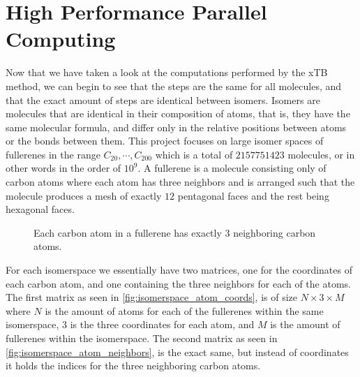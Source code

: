 
\section{High Performance Parallel Computing}

Now that we have taken a look at the computations performed by the xTB method, we can begin to see that the steps are the same for all molecules, and that the exact amount of steps are identical between isomers. Isomers are molecules that are identical in their composition of atoms, that is, they have the same molecular formula, and differ only in the relative positions between atoms or the bonds between them.
This project focuses on large isomer spaces of fullerenes in the range \(C_{20}, \cdots, C_{200} \) which is a total of $2157751423$ molecules, or in other words in the order of $10^9$. A fullerene is a molecule consisting only of carbon atoms where each atom has three neighbors and is arranged such that the molecule produces a mesh of exactly $12$ pentagonal faces and the rest being hexagonal faces.

\begin{figure}[H]
\centering
{}
\caption{Each carbon atom in a fullerene has exactly 3 neighboring carbon atoms.}
\label{fig:carbon-degree}
\end{figure}

For each isomerspace we essentially have two matrices, one for the coordinates of each carbon atom, and one containing the three neighbors for each of the atoms. The first matrix as seen in \autoref{fig:isomerspace_atom_coords}, is of size $N \times 3 \times M$ where $N$ is the amount of atoms for each of the fullerenes within the same isomerspace, $3$ is the three coordinates for each atom, and $M$ is the amount of fullerenes within the isomerspace. The second matrix as seen in \autoref{fig:isomerspace_atom_neighbors}, is the exact same, but instead of coordinates it holds the indices for the three neighboring carbon atoms.

